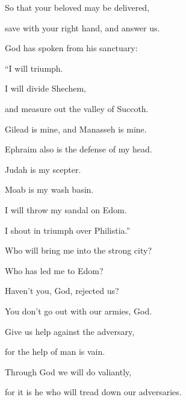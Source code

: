 {\BB \par }{\Q {}So that your beloved may be delivered,
\par }{\QB save with your right hand, and answer us.
\par }{\Q {}God has spoken from his sanctuary:
\par }{\QB “I will triumph.
\par }{\QB I will divide Shechem,
\par }{\QB and measure out the valley of Succoth.
\par }{\Q {}Gilead is mine, and Manasseh is mine.
\par }{\QB Ephraim also is the defense of my head.
\par }{\QB Judah is my scepter.
\par }{\Q {}Moab is my wash basin.
\par }{\QB I will throw my sandal on Edom.
\par }{\QB I shout in triumph over Philistia.”
\par }{\BB \par }{\Q {}Who will bring me into the strong city?
\par }{\QB Who has led me to Edom?
\par }{\Q {}Haven’t you, God, rejected us?
\par }{\QB You don’t go out with our armies, God.
\par }{\Q {}Give us help against the adversary,
\par }{\QB for the help of man is vain.
\par }{\Q {}Through God we will do valiantly,
\par }{\QB for it is he who will tread down our adversaries.

\par }
